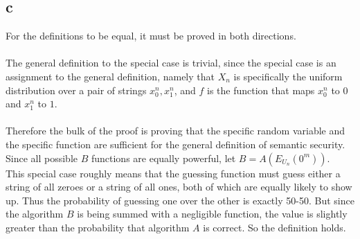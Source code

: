 \documentclass[letterpaper,notitlepage,twoside]{article}
\begin{document}
\subsection*{c}
For the definitions to be equal, it must be proved in both directions.\\\\
The general definition to the special case is trivial, since the special case is an assignment to the general definition, namely that $X_n$ is specifically the uniform distribution over a pair of strings $x_0^n, x_1^n$, and $f$ is the function that maps $x_0^n$ to $0$ and $x_1^n$ to $1$.\\\\
Therefore the bulk of the proof is proving that the specific random variable and the specific function are sufficient for the general definition of semantic security. Since all possible $B$ functions are equally powerful, let $B = A(E_{U_n}(0^m))$.\\

This special case roughly means that the guessing function must guess either a string of all zeroes or a string of all ones, both of which are equally likely to show up. Thus the probability of guessing one over the other is exactly 50-50. But since the algorithm $B$ is being summed with a negligible function, the value is slightly greater than the probability that algorithm $A$ is correct. So the definition holds.
\end{document}
